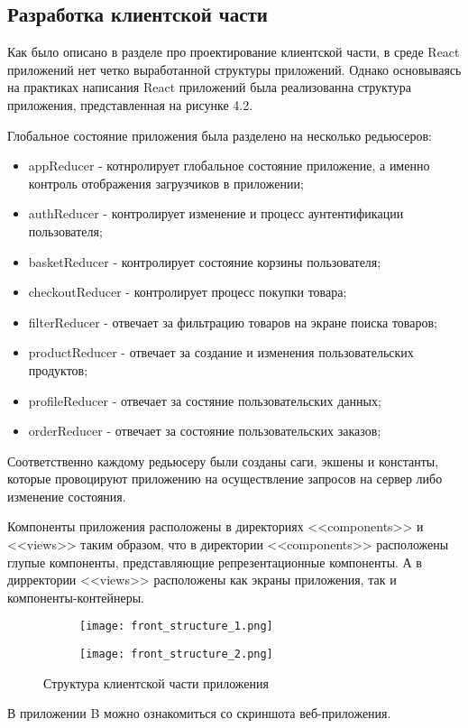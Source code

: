\subsection{Разработка клиентской части}

Как было описано в разделе про проектирование клиентской части, в среде React приложений нет четко выработанной структуры приложений.
Однако основываясь на практиках написания React приложений была реализованна структура приложения, представленная на рисунке 4.2.

Глобальное состояние приложения была разделено на несколько редьюсеров:
\begin{itemize}
    \item appReducer - котнролирует глобальное состояние приложение, а именно контроль отображения загрузчиков в приложении;
    \item authReducer - контролирует изменение и процесс аунтентификации пользователя;
    \item basketReducer - контролирует состояние корзины пользователя;
    \item checkoutReducer - контролирует процесс покупки товара;
    \item filterReducer - отвечает за фильтрацию товаров на экране поиска товаров;
    \item productReducer - отвечает за создание и изменения пользовательских продуктов;
    \item profileReducer - отвечает за состяние пользовательских данных;
    \item orderReducer - отвечает за состояние пользовательских заказов;
\end{itemize}

Соответственно каждому редьюсеру были созданы саги, экшены и константы, которые провоцируют приложению на осуществление запросов на сервер либо изменение состояния.

Компоненты приложения расположены в директориях <<components>> и <<views>> таким образом, что в директории <<components>> расположены глупые компоненты, представляющие репрезентационные компоненты.
А в дирректории <<views>> расположены как экраны приложения, так и компоненты-контейнеры.

\begin{figure}[h!]
    \begin{subfigure}[b]{0.45\textwidth}
    \centering
    \texttt{[image: front\_structure\_1.png]}
    \caption{}
    \end{subfigure}
    \begin{subfigure}[b]{0.3\textwidth}
    \centering
    \texttt{[image: front\_structure\_2.png]}
    \caption{}
    \end{subfigure}
    \caption{ Структура клиентской части приложения }
\end{figure}

В приложении B можно ознакомиться со скриншота веб-приложения.
